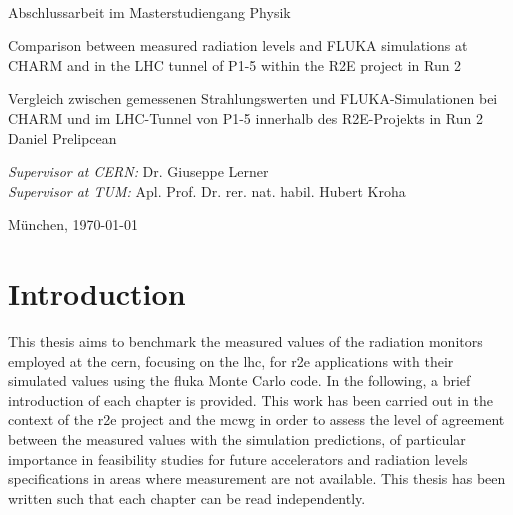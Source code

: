 \documentclass[encoding=utf8,british]{tumphthesis}
\begin{document}
\begin{titlepage}
\begin{center}
 
\LARGE
{} \\
 
\vspace{15mm}

\LARGE{Abschlussarbeit im Masterstudiengang Physik}

\vspace{12.5mm}

\LARGE{Comparison between measured radiation levels and FLUKA simulations at CHARM and in the LHC tunnel of P1-5 within the R2E project in Run 2}\\

\vspace{12.5mm}

\large{Vergleich zwischen gemessenen Strahlungswerten und FLUKA-Simulationen bei CHARM und im LHC-Tunnel von P1-5 innerhalb des R2E-Projekts in Run 2} \\
 
\vspace{12.5mm}
\large{Daniel Prelipcean}\\
\vspace{7.5mm}


\textit{Supervisor at CERN:} \large Dr. Giuseppe Lerner\\
\textit{Supervisor at TUM:} \large Apl. Prof. Dr. rer. nat. habil. Hubert Kroha\\

\end{center}


\vfill
\begin{center}
\normalsize{\large{München, \today}}
\end{center}
\end{titlepage}

\setcounter{tocdepth}{4}

\tableofcontents


\mainmatter

\chapter{Introduction}

This thesis aims to benchmark the measured values of the radiation monitors employed at the \acrfull{cern}, focusing on the \acrfull{lhc}, for \acrfull{r2e} applications with their simulated values using the \acrshort{fluka} Monte Carlo code. In the following, a brief introduction of each chapter is provided. This work has been carried out in the context of the \acrfull{r2e} project and the \acrfull{mcwg} in order to assess the level of agreement between the measured values with the simulation predictions, of particular importance in feasibility studies for future accelerators and radiation levels specifications in areas where measurement are not available. This thesis has been written such that each chapter can be read independently.
\end{document}

